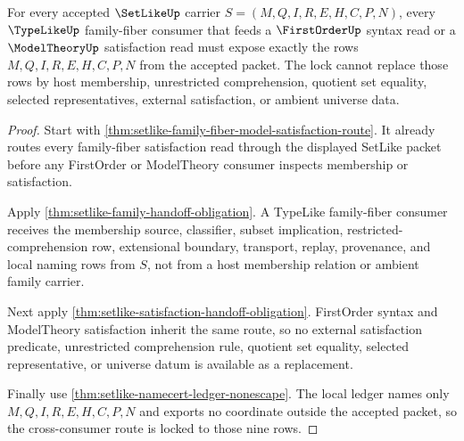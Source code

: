 \begin{theorem}
\label{thm:setlike-family-fiber-firstorder-modeltheory-lock}
For every accepted $\SetLikeUp$ carrier $S=(M,Q,I,R,E,H,C,P,N)$, every $\TypeLikeUp$ family-fiber consumer that feeds a $\FirstOrderUp$ syntax read or a $\ModelTheoryUp$ satisfaction read must expose exactly the rows $M,Q,I,R,E,H,C,P,N$ from the accepted packet. The lock cannot replace those rows by host membership, unrestricted comprehension, quotient set equality, selected representatives, external satisfaction, or ambient universe data.
\end{theorem}
\begin{proof}
Start with \autoref{thm:setlike-family-fiber-model-satisfaction-route}. It already routes every family-fiber satisfaction read through the displayed SetLike packet before any FirstOrder or ModelTheory consumer inspects membership or satisfaction.

Apply \autoref{thm:setlike-family-handoff-obligation}. A TypeLike family-fiber consumer receives the membership source, classifier, subset implication, restricted-comprehension row, extensional boundary, transport, replay, provenance, and local naming rows from $S$, not from a host membership relation or ambient family carrier.

Next apply \autoref{thm:setlike-satisfaction-handoff-obligation}. FirstOrder syntax and ModelTheory satisfaction inherit the same route, so no external satisfaction predicate, unrestricted comprehension rule, quotient set equality, selected representative, or universe datum is available as a replacement.

Finally use \autoref{thm:setlike-namecert-ledger-nonescape}. The local ledger names only $M,Q,I,R,E,H,C,P,N$ and exports no coordinate outside the accepted packet, so the cross-consumer route is locked to those nine rows.
\end{proof}
